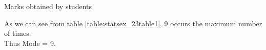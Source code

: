 
	\begin{table}[ht]
    \begin{center}
    	
  \caption{Marks obtained by students}
   \label{table:statsex_23table1}
   \end{center}	
\end{table}

As we can see from table \ref{table:statsex_23table1}, 9 occurs the maximum number of times.\\
Thus Mode = 9.


